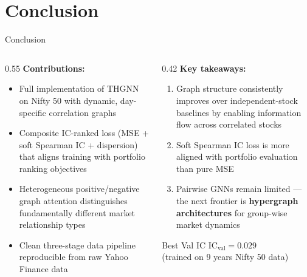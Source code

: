\documentclass[aspectratio=169, 10pt]{beamer}
\begin{document}
\section{Conclusion}

\begin{frame}{Conclusion}
  \begin{columns}[T]
    \begin{column}{0.55\textwidth}
      \textbf{Contributions:}
      \begin{itemize}
        \item Full implementation of THGNN on Nifty 50 with dynamic,
              day-specific correlation graphs
        \item Composite IC-ranked loss (MSE + soft Spearman IC + dispersion)
              that aligns training with portfolio ranking objectives
        \item Heterogeneous positive/negative graph attention distinguishes
              fundamentally different market relationship types
        \item Clean three-stage data pipeline reproducible from raw Yahoo
              Finance data
      \end{itemize}
    \end{column}
    \begin{column}{0.42\textwidth}
      \textbf{Key takeaways:}
      \begin{enumerate}
        \item Graph structure consistently improves over independent-stock
              baselines by enabling information flow across correlated stocks
        \item Soft Spearman IC loss is more aligned with portfolio evaluation
              than pure MSE
        \item Pairwise GNNs remain limited — the next frontier is
              \textbf{hypergraph architectures} for group-wise market dynamics
      \end{enumerate}

      \bigskip
      \begin{block}{Best Val IC}
        \centering
        $\text{IC}_\text{val} = 0.029$\\
        \small (trained on 9 years Nifty 50 data)
      \end{block}
    \end{column}
  \end{columns}
\end{frame}
\end{document}
